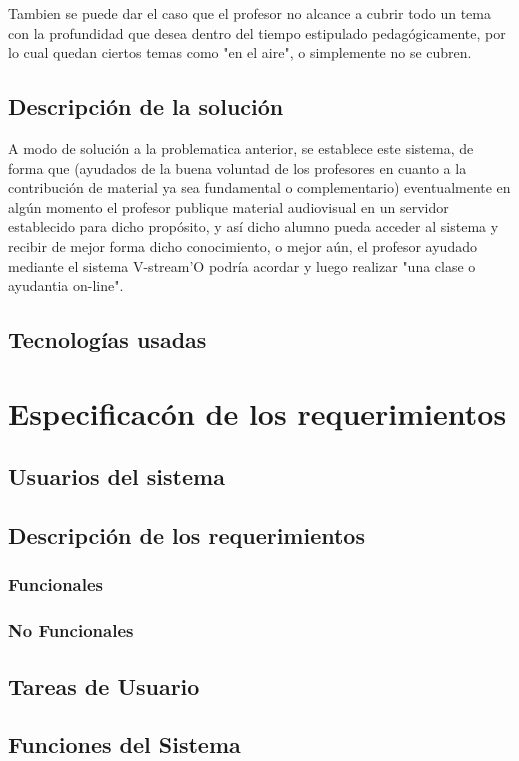 \documentclass[12pt]{article}
\begin{document}
Tambien se puede dar el caso que el profesor no alcance a cubrir todo un tema con la profundidad que desea
dentro del tiempo estipulado pedagógicamente, por lo cual quedan ciertos temas como "en el aire", o
simplemente no se cubren.


\subsection{Descripción de la solución}
A modo de solución a la problematica anterior, se establece este sistema, de forma que (ayudados de la buena
voluntad de los profesores en cuanto a la contribución de material ya sea fundamental o complementario) 
eventualmente en algún momento el profesor publique material 
audiovisual en un servidor establecido para dicho propósito, y así dicho alumno pueda acceder al sistema 
y recibir de mejor forma dicho conocimiento, o mejor aún, el profesor ayudado mediante el sistema V-stream'O podría
acordar y luego realizar "una clase o ayudantia on-line".

\subsection{Tecnologías usadas}

\newpage
\section{Especificacón de los requerimientos}
\subsection{Usuarios del sistema}
\subsection{Descripción de los requerimientos}
\subsubsection{Funcionales}
\subsubsection{No Funcionales}
\subsection{Tareas de Usuario}
\subsection{Funciones del Sistema}
\end{document}
